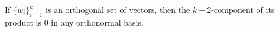 \begin{lemma}\label{l:grade-k-2}
	If $\{w_i\}_{i=1}^k$ is an orthogonal set of vectors, then the $k-2$-component of its product is 0 in any orthonormal basis.
\end{lemma}
